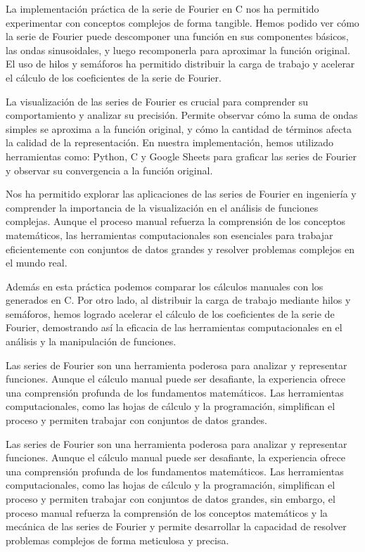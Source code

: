 La implementación práctica de la serie de Fourier en C nos ha permitido experimentar con conceptos complejos de forma tangible. Hemos podido ver cómo la serie de Fourier puede descomponer una función en sus componentes básicos, las ondas sinusoidales, y luego recomponerla para aproximar la función original. El uso de hilos y semáforos ha permitido distribuir la carga de trabajo y acelerar el cálculo de los coeficientes de la serie de Fourier.

La visualización de las series de Fourier es crucial para comprender su comportamiento y analizar su precisión. Permite observar cómo la suma de ondas simples se aproxima a la función original, y cómo la cantidad de términos afecta la calidad de la representación. En nuestra implementación, hemos utilizado herramientas como: Python, C y Google Sheets para graficar las series de Fourier y observar su convergencia a la función original.

Nos ha permitido explorar las aplicaciones de las series de Fourier en ingeniería y comprender la importancia de la visualización en el análisis de funciones complejas. Aunque el proceso manual refuerza la comprensión de los conceptos matemáticos, las herramientas computacionales son esenciales para trabajar eficientemente con conjuntos de datos grandes y resolver problemas complejos en el mundo real.

Además en esta práctica podemos comparar los cálculos manuales con los generados en C. Por otro lado, al distribuir la carga de trabajo mediante hilos y semáforos, hemos logrado acelerar el cálculo de los coeficientes de la serie de Fourier, demostrando así la eficacia de las herramientas computacionales en el análisis y la manipulación de funciones.


Las series de Fourier son una herramienta poderosa para analizar y representar funciones. Aunque el cálculo manual puede ser desafiante, la experiencia ofrece una comprensión profunda de los fundamentos matemáticos. Las herramientas computacionales, como las hojas de cálculo y la programación, simplifican el proceso y permiten trabajar con conjuntos de datos grandes.

Las series de Fourier son una herramienta poderosa para analizar y representar funciones. Aunque el cálculo manual puede ser desafiante, la experiencia ofrece una comprensión profunda de los fundamentos matemáticos. Las herramientas computacionales, como las hojas de cálculo y la programación, simplifican el proceso y permiten trabajar con conjuntos de datos grandes, sin embargo, el proceso manual refuerza la comprensión de los conceptos matemáticos y la mecánica de las series de Fourier y permite desarrollar la capacidad de resolver problemas complejos de forma meticulosa y precisa.

